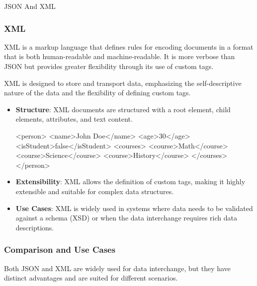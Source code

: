 \begin{notes}{JSON And XML}
\begin{highlight}[JSON]
    \end{highlight}
    
    \subsubsection*{XML}
    
    XML is a markup language that defines rules for encoding documents in a format that is both human-readable and machine-readable. It is more verbose than JSON but provides greater flexibility through 
    its use of custom tags.
    
    \begin{highlight}[XML]
    
        XML is designed to store and transport data, emphasizing the self-descriptive nature of the data and the flexibility of defining custom tags.
        
        \begin{itemize}
            \item \textbf{Structure}: XML documents are structured with a root element, child elements, attributes, and text content.
    \begin{code}[XML]
    <person>
        <name>John Doe</name>
        <age>30</age>
        <isStudent>false</isStudent>
        <courses>
            <course>Math</course>
            <course>Science</course>
            <course>History</course>
        </courses>
    </person>
    \end{code}
            \item \textbf{Extensibility}: XML allows the definition of custom tags, making it highly extensible and suitable for complex data structures.
            \item \textbf{Use Cases}: XML is widely used in systems where data needs to be validated against a schema (XSD) or when the data interchange requires rich data descriptions.
        \end{itemize}
    
    \end{highlight}
    
    \subsubsection*{Comparison and Use Cases}
    
    Both JSON and XML are widely used for data interchange, but they have distinct advantages and are suited for different scenarios.
    

\end{notes}
